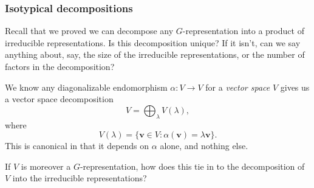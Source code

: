 \documentclass[a4paper]{article}
\begin{document}
\subsubsection*{Isotypical decompositions}
Recall that we proved we can decompose any $G$-representation into a product of irreducible representations. Is this decomposition unique? If it isn't, can we say anything about, say, the size of the irreducible representations, or the number of factors in the decomposition?

We know any diagonalizable endomorphism $\alpha: V \to V$ for a \emph{vector space} $V$ gives us a vector space decomposition
\[
  V = \bigoplus_{\lambda} V(\lambda),
\]
where
\[
  V(\lambda) = \{\mathbf{v} \in V: \alpha(\mathbf{v}) = \lambda \mathbf{v}\}.
\]
This is canonical in that it depends on $\alpha$ alone, and nothing else.

If $V$ is moreover a $G$-representation, how does this tie in to the decomposition of $V$ into the irreducible representations?
\end{document}
